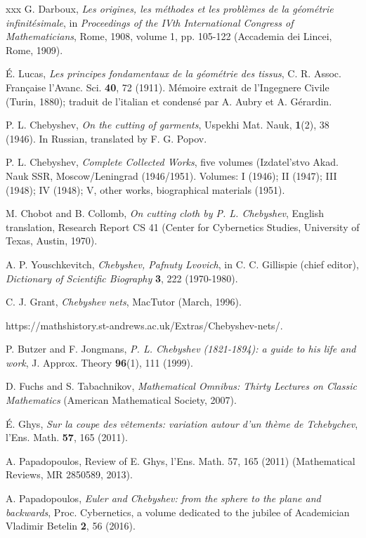 \documentclass[12pt]{article}
\begin{document}
\begin{thebibliography}{xxx}
G. Darboux, {\it Les origines, les m\'ethodes et les probl\`emes de la g\'eom\'etrie infinit\'esimale}, in {\it Proceedings of the IVth International Congress of Mathematicians}, Rome, 1908, volume 1, pp. 105-122 (Accademia dei Lincei, Rome, 1909).

\'E. Lucas, {\it Les principes fondamentaux de la g\'eom\'etrie des tissus}, C. R. Assoc. Fran\c caise l'Avanc. Sci. {\bf 40}, 72 (1911). M\'emoire extrait de l'Ingegnere Civile (Turin, 1880); traduit de l'italian et condens\'e par A. Aubry et A. G\'erardin.

P. L. Chebyshev, {\it On the cutting of garments}, Uspekhi Mat. Nauk, {\bf 1}(2), 38 (1946). In Russian, translated by F. G. Popov.

P. L. Chebyshev, {\it Complete Collected Works}, five volumes (Izdatel'stvo Akad. Nauk SSR, Moscow/Leningrad (1946/1951). Volumes: I (1946); II (1947); III (1948); IV (1948); V, other works, biographical materials (1951).

M. Chobot and B. Collomb, {\it On cutting cloth by P. L. Chebyshev}, English translation, Research Report CS 41 (Center for Cybernetics Studies, University of Texas, Austin, 1970).

 A. P. Youschkevitch, {\it Chebyshev, Pafnuty Lvovich}, in C. C. Gillispie (chief editor), {\it Dictionary of Scientific Biography} {\bf 3}, 222 (1970-1980).

C. J. Grant, {\it Chebyshev nets}, MacTutor (March, 1996). 

https://mathshistory.st-andrews.ac.uk/Extras/Chebyshev-nets/.

P. Butzer and F. Jongmans, {\it P. L. Chebyshev (1821-1894): a guide to his life and work}, J. Approx. Theory {\bf 96}(1), 111 (1999).

D. Fuchs and S. Tabachnikov, {\it Mathematical Omnibus: Thirty Lectures on Classic Mathematics} (American Mathematical Society, 2007).

\'E. Ghys, {\it Sur la coupe des v\^etements: variation autour d'un th\`eme de Tchebychev}, l'Ens. Math. {\bf 57}, 165 (2011).

A. Papadopoulos, Review of E. Ghys, l'Ens. Math. 57, 165 (2011) \cite{Ghys2011} (Mathematical Reviews, MR 2850589, 2013).

A. Papadopoulos, {\it Euler and Chebyshev: from the sphere to the plane and backwards}, Proc. Cybernetics, a volume dedicated to the jubilee of Academician Vladimir Betelin {\bf 2}, 56 (2016).


\end{thebibliography}
\end{document}
